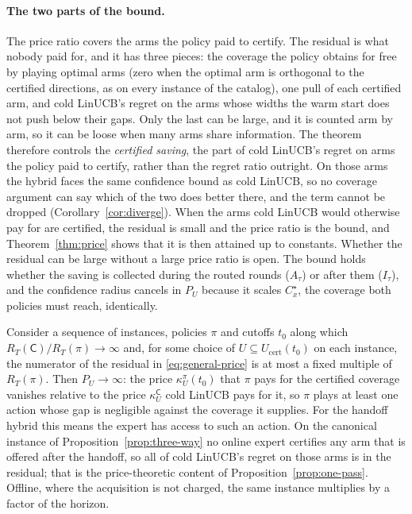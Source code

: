 \documentclass[anon]{alt2027} %
\newcommand{\Cold}{\mathsf{C}}
\begin{document}
\paragraph{The two parts of the bound.}
The price ratio covers the arms the policy paid to certify. The
residual is what nobody paid for, and it has three pieces: the coverage the policy obtains for free by playing optimal arms
(zero when the optimal arm is orthogonal to the certified directions, as on
every instance of the catalog), one pull of each certified arm,
and cold LinUCB's regret on the arms whose widths the warm start does not push
below their gaps. Only the last can be large, and it is counted arm by arm,
so it can be loose when many arms share information. The theorem therefore
controls the \emph{certified saving}, the part of cold LinUCB's regret on arms
the policy paid to certify, rather than the regret ratio outright. On those arms the hybrid faces
the same confidence bound as cold LinUCB, so no coverage argument can say
which of the two does better there, and the term cannot be dropped
(Corollary~\ref{cor:diverge}). When the arms cold LinUCB would
otherwise pay for are certified, the residual is small and the price ratio is
the bound, and Theorem~\ref{thm:price} shows that it is then attained up to
constants.
Whether the residual can be large without a large price ratio is open. The
bound holds whether the saving is collected during the routed rounds
($A_\tau$) or after them ($I_\tau$), and the confidence radius cancels in
$P_U$ because it scales $C^\star_x$, the coverage both policies must reach,
identically.

\begin{corollary}
\label{cor:diverge}
Consider a sequence of instances, policies $\pi$ and cutoffs $t_0$ along
which $R_T(\Cold)/R_T(\pi)\to\infty$ and, for some choice of
$U\subseteq U_{\mathrm{cert}}(t_0)$ on each instance, the numerator of the
residual in \eqref{eq:general-price} is at most a fixed multiple of $R_T(\pi)$.
Then $P_U\to\infty$: the price $\kappa^\pi_U(t_0)$ that $\pi$ pays for the certified
coverage vanishes relative to the price $\kappa^{\Cold}_U$ cold LinUCB pays for it, so
$\pi$ plays at least one action whose gap is negligible against the coverage it supplies.
For the handoff hybrid this means the expert has access to such an action.
On the canonical instance of Proposition~\ref{prop:three-way} no online expert
certifies any arm that is offered after the handoff, so all of cold LinUCB's
regret on those arms is in the residual; that is the price-theoretic content of
Proposition~\ref{prop:one-pass}. Offline, where the acquisition is not
charged, the same instance multiplies by a factor of the horizon.
\end{corollary}
\end{document}
